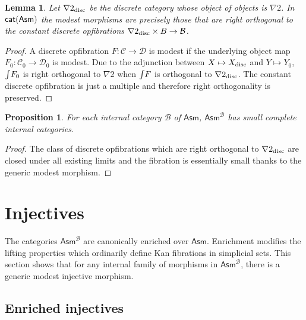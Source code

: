 \documentclass{amsart}
\theoremstyle{plain}
\newtheorem{lemma}[theorem]{Lemma}
\newtheorem{prop}[theorem]{Proposition}
\theoremstyle{definition}
\newcommand\hide[1]{}
\newcommand\cat\mathcal
\newcommand\Asm{\mathsf{Asm}}
\begin{document}
\newcommand\disc{_{\rm disc}}
\begin{lemma} Let $\nabla 2\disc$ be the discrete category whose object of objects is $\nabla 2$. In $\mathsf{cat(Asm)}$ the modest morphisms are precisely those that are right orthogonal to the constant discrete opfibrations $\nabla 2\disc \times\cat \cat B \to\cat B$. \end{lemma}

\hide{\tot preserves discrete opfibrations. Kunnen we dat niet beter gebruiken?}
\begin{proof} A discrete opfibration $F:\cat C\to\cat D$ is modest if the underlying object map $F_0:\cat C_0 \to \cat D_0$ is modest. Due to the adjunction between $X\mapsto X\disc$ and $Y\mapsto Y_0$, $\mathord{\int} F_0$ is right orthogonal to $\nabla 2$ when $\mathord{\int} F$ is orthogonal to $\nabla 2\disc$. The constant discrete opfibration is just a multiple and therefore right orthogonality is preserved.
\end{proof}


\begin{prop} For each internal category $\cat B$ of $\Asm$, $\Asm^{\cat B}$ has small complete internal categories.\end{prop}

\begin{proof} The class of discrete opfibrations which are right orthogonal to $\nabla 2\disc$ are closed under all existing limits and the fibration is essentially small thanks to the generic modest morphism. \end{proof}

\newcommand\sAsm{\mathsf{sAsm}}

\section{Injectives}
The categories $\Asm^{\cat B}$ are canonically enriched over $\Asm$. Enrichment modifies the lifting properties which ordinarily define Kan fibrations in simplicial sets. This section shows that for any internal family of morphisms in $\Asm^{\cat B}$, there is a generic modest injective morphism. %

\subsection{Enriched injectives}
\end{document}

